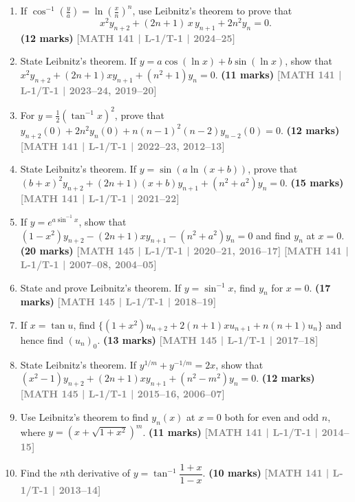 \documentclass[12pt,a3paper]{article}
\newcommand{\yr}[1]{\hfill\textcolor{gray}{\small\textbf{[#1]}}}
\newcommand{\mk}[1]{\textcolor{orange!70!black}{\small\textbf{(#1 marks)}}}
\begin{document}
\begin{enumerate}

\item If $\displaystyle\cos^{-1}\!\left(\frac{y}{a}\right)=\ln\!\left(\frac{x}{n}\right)^{n}$, use Leibnitz's theorem to prove that
    \[
      x^{2}y_{n+2}+(2n+1)\,x\,y_{n+1}+2n^{2}y_{n}=0.
    \] 
\mk{12}  \yr{MATH 141 | L-1/T-1 | 2024--25} 
  
\item State Leibnitz's theorem. If $y=a\cos(\ln x)+b\sin(\ln x)$, show that $x^{2}y_{n+2}+(2n+1)xy_{n+1}+(n^2+1)y_{n}=0$.
\mk{11} \yr{MATH 141 | L-1/T-1 | 2023--24, 2019--20}

\item For $y=\tfrac{1}{2}(\tan^{-1}x)^{2}$, prove that $y_{n+2}(0)+2n^{2}y_{n}(0)+n(n-1)^{2}(n-2)y_{n-2}(0)=0$.
\mk{12} \yr{MATH 141 | L-1/T-1 | 2022--23, 2012--13}

\item State Leibnitz's theorem. If $y=\sin(a\ln(x+b))$, prove that $(b+x)^{2}y_{n+2}+(2n+1)(x+b)y_{n+1}+(n^{2}+a^{2})y_{n}=0$.
\mk{15} \yr{MATH 141 | L-1/T-1 | 2021--22}

\item If $y=e^{a\sin^{-1}x}$, show that $(1-x^{2})y_{n+2}-(2n+1)xy_{n+1}-(n^{2}+a^{2})y_{n}=0$ and find $y_{n}$ at $x=0$.
\mk{20} \yr{MATH 145 | L-1/T-1 | 2020--21, 2016--17} \yr{MATH 141 | L-1/T-1 | 2007--08, 2004--05}

\item State and prove Leibnitz's theorem. If $y=\sin^{-1}x$, find $y_{n}$ for $x=0$.
\mk{17} \yr{MATH 145 | L-1/T-1 | 2018--19}

\item If $x=\tan u$, find $\{(1+x^{2})u_{n+2}+2(n+1)xu_{n+1}+n(n+1)u_{n}\}$ and hence find $(u_{n})_{0}$.
\mk{13} \yr{MATH 145 | L-1/T-1 | 2017--18}

\item State Leibnitz's theorem. If $y^{1/m}+y^{-1/m}=2x$, show that $(x^{2}-1)y_{n+2}+(2n+1)xy_{n+1}+(n^{2}-m^{2})y_{n}=0$.
\mk{12} \yr{MATH 145 | L-1/T-1 | 2015--16, 2006--07}

\item Use Leibnitz's theorem to find $y_{n}(x)$ at $x=0$ both for even and odd $n$, where $y=\left(x+\sqrt{1+x^{2}}\right)^{m}$.
\mk{11} \yr{MATH 141 | L-1/T-1 | 2014--15}

\item Find the $n$th derivative of $y=\tan^{-1}\!\dfrac{1+x}{1-x}$.
\mk{10} \yr{MATH 141 | L-1/T-1 | 2013--14}


\end{enumerate}
\end{document}
